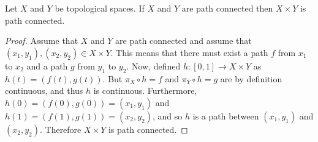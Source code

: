 \documentclass[letterpaper,12pt,fleqn]{article}
\begin{document}
\begin{theorem}[8.38]
  Let \(X\) and \(Y\) be topological spaces.  If \(X\) and \(Y\) are path connected then \(X\times Y\) is path
  connected.
\end{theorem}

\begin{proof}
  Assume that \(X\) and \(Y\) are path connected and assume that \((x_1,y_1),(x_2,y_2)\in X\times Y\).  This means
  that there must exist a path \(f\) from \(x_1\) to \(x_2\) and a path \(g\) from \(y_1\) to \(y_2\).  Now,
  defined \(h:[0,1]\to X\times Y\) as \(h(t)=(f(t),g(t))\).  But \(\pi_X\circ h=f\) and \(\pi_Y\circ h=g\) are
  by definition continuous, and thus \(h\) is continuous.  Furthermore, \(h(0)=(f(0),g(0))=(x_1,y_1)\) and
  \(h(1)=(f(1),g(1))=(x_2,y_2)\), and so \(h\) is a path between \((x_1,y_1)\) and \((x_2,y_2)\).  Therefore
  \(X\times Y\) is path connected.
\end{proof}
\end{document}
